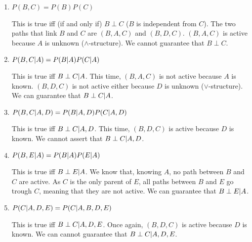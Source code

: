 \documentclass[11pt, a4paper]{article}
\begin{document}
\begin{enumerate}
    \item $P(B, C) = P(B) P(C)$
    
    \begin{solution}
        This is true iff (if and only if) $B \perp C$ ($B$ is independent from $C$). The two paths that link $B$ and $C$ are $(B, A, C)$ and $(B, D, C)$. $(B, A, C)$ is active because $A$ is unknown ($\wedge$-structure). We cannot guarantee that $B \perp C$.
    \end{solution}
    
    \item $P(B, C \vert A) = P(B \vert A) P(C \vert A)$
    
    \begin{solution}
        This is true iff $B \perp C \vert A$. This time, $(B, A, C)$ is not active because $A$ is known. $(B, D, C)$ is not active either because $D$ is unknown ($\vee$-structure). We can guarantee that $B \perp C \vert A$.
    \end{solution}
    
    \item $P(B, C \vert A, D) =  P(B \vert A, D) P(C \vert A, D)$
    
    \begin{solution}
        This is true iff $B \perp C \vert A, D$. This time, $(B, D, C)$ is active because $D$ is known. We cannot assert that $B \perp C \vert A, D$.
    \end{solution}
    
    \item $P(B, E \vert A) = P(B \vert A) P(E \vert A)$
    
    \begin{solution}
        This is true iff $B \perp E \vert A$. We know that, knowing $A$, no path between $B$ and $C$ are active. As $C$ is the only parent of $E$, all paths between $B$ and $E$ go trough $C$, meaning that they are not active. We can guarantee that $B \perp E \vert A$.
    \end{solution}
    
    \item $P(C \vert A, D, E) = P(C \vert A, B, D, E)$
    
    \begin{solution}
        This is true iff $B \perp C \vert A, D, E$. Once again, $(B, D, C)$ is active because $D$ is known. We can cannot guarantee that $B \perp C \vert A, D, E$.
    \end{solution}
    

\end{enumerate}
\end{document}
